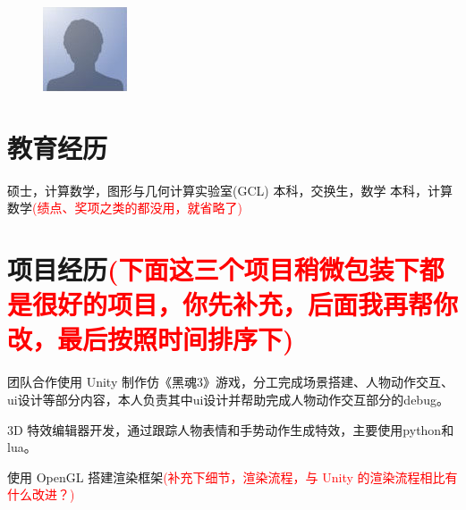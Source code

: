 \documentclass{resume}
\begin{document}
\begin{figure}[H]
  \begin{minipage}{.69\textwidth}
    \vspace{10pt}
    \newline
    \newline
  \end{minipage}
  \begin{minipage}{.29\textwidth}
    \vspace{-5pt}
    \centering
    \includegraphics[scale = 1]{avatar.jpg}
  \end{minipage}
\end{figure}
\vspace{-25pt}
\section{教育经历}
硕士，计算数学，图形与几何计算实验室(GCL)
本科，交换生，数学
本科，计算数学\textcolor{red}{(绩点、奖项之类的都没用，就省略了)}

\section{项目经历\textcolor{red}{(下面这三个项目稍微包装下都是很好的项目，你先补充，后面我再帮你改，最后按照时间排序下)}}
团队合作使用 Unity 制作仿《黑魂3》游戏，分工完成场景搭建、人物动作交互、ui设计等部分内容，本人负责其中ui设计并帮助完成人物动作交互部分的debug。

3D 特效编辑器开发，通过跟踪人物表情和手势动作生成特效，主要使用python和lua。


使用 OpenGL 搭建渲染框架\textcolor{red}{(补充下细节，渲染流程，与 Unity 的渲染流程相比有什么改进？)}
\end{document}
